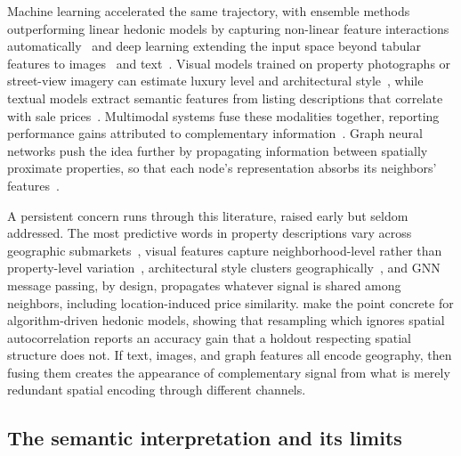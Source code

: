\documentclass{article}
\begin{document}
Machine learning accelerated the same trajectory, with ensemble methods outperforming linear hedonic models by capturing non-linear feature interactions automatically~\citep{park2015using,antipov2012mass} and deep learning extending the input space beyond tabular features to images~\citep{poursaeed2018vision,law2019understanding} and text~\citep{shen2021information,baur2023automated}. Visual models trained on property photographs or street-view imagery can estimate luxury level and architectural style~\citep{poursaeed2018vision,lindenthal2021architectural}, while textual models extract semantic features from listing descriptions that correlate with sale prices~\citep{nowak2017textual,ahmed2016house}. Multimodal systems fuse these modalities together, reporting performance gains attributed to complementary information~\citep{bin2020multisource,kang2021human,kostic2020imagefeatures}. Graph neural networks push the idea further by propagating information between spatially proximate properties, so that each node's representation absorbs its neighbors' features~\citep{das2021boosting,lin2021spatial,peng2022lifelong,li2018diffusion,huang2018deepcrime}.

A persistent concern runs through this literature, raised early but seldom addressed. The most predictive words in property descriptions vary across geographic submarkets~\citep{nowak2017textual,nowak2021dictionaries}, visual features capture neighborhood-level rather than property-level variation~\citep{law2019understanding}, architectural style clusters geographically~\citep{lindenthal2021architectural}, and GNN message passing, by design, propagates whatever signal is shared among neighbors, including location-induced price similarity. \citet{deppner2022accounting} make the point concrete for algorithm-driven hedonic models, showing that resampling which ignores spatial autocorrelation reports an accuracy gain that a holdout respecting spatial structure does not. If text, images, and graph features all encode geography, then fusing them creates the appearance of complementary signal from what is merely redundant spatial encoding through different channels.

\subsection{The semantic interpretation and its limits}
\end{document}
